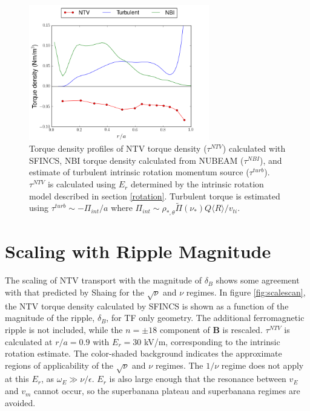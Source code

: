 \documentclass{article}
\numberwithin{figure}{section}
\numberwithin{equation}{section}
\begin{document}
\begin{figure}[h!]
\centering
\includegraphics[width=0.7\textwidth]{AllTorquePlot.png}
\caption{\label{fig:alltorque} Torque density profiles of NTV torque density ($\tau^{NTV}$) calculated with SFINCS, NBI torque density calculated from NUBEAM ($\tau^{NBI}$), and estimate of turbulent intrinsic rotation momentum source ($\tau^{turb}$). $\tau^{NTV}$ is calculated using $E_r$ determined by the intrinsic rotation model described in section \ref{rotation}. Turbulent torque is estimated using $\tau^{turb} \sim -\Pi_{int}/a$ where $\Pi_{int} \sim \rho_{*, \theta} \widetilde{\Pi}(\nu_*) Q \langle R \rangle/v_{ti}$.}
\end{figure}

\FloatBarrier

\section{Scaling with Ripple Magnitude}\label{scaling}
The scaling of NTV transport with the magnitude of $\delta_B$ shows some agreement with that predicted by Shaing \cite{Shaing2008} for the $\sqrt{\nu}$ and $\nu$ regimes. In figure \ref{fig:scalescan}, the NTV torque density calculated by SFINCS is shown as a function of the magnitude of the ripple, $\delta_B$, for TF only geometry. The additional ferromagnetic ripple is not included, while the $n= \pm18$ component of $\bm{B}$ is rescaled. $\tau^{NTV}$ is calculated at $r/a = 0.9$ with $E_r = 30$ kV/m, corresponding to the intrinsic rotation estimate. The color-shaded background indicates the approximate regions of applicability of the $\sqrt{\nu}$ and $\nu$ regimes. The $1/\nu$ regime does not apply at this $E_r$, as $\omega_E \gg \nu/\epsilon$. $E_r$ is also large enough that the resonance between $v_{E}$ and $v_{m}$ cannot occur, so the superbanana plateau and superbanana regimes are avoided. 
\end{document}
